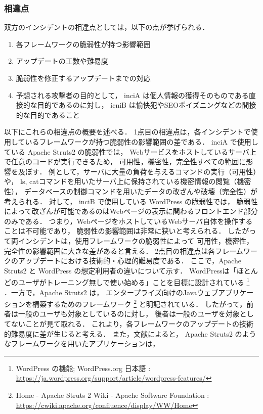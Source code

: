\documentclass[uplatex]{jsarticle}
\begin{document}
\subsubsection*{相違点}
双方のインシデントの相違点としては，以下の点が挙げられる．
\begin{enumerate}
    \item 各フレームワークの脆弱性が持つ影響範囲
    \item アップデートの工数や難易度
    \item 脆弱性を修正するアップデートまでの対応
    \item 予想される攻撃者の目的として，
    inciA は個人情報の獲得そのものである直接的な目的であるのに対し，
    icniB は愉快犯やSEOポイズニングなどの間接的な目的であること
\end{enumerate}
以下にこれらの相違点の概要を述べる．
1点目の相違点は，各インシデントで使用しているフレームワークが持つ脆弱性の影響範囲の差である．
inciA で使用している Apache Struts2 の脆弱性では，
Webサービスをホストしているサーバ上で任意のコードが実行できるため，
可用性，機密性，完全性すべての範囲に影響を及ぼす．
例として，サーバに大量の負荷を与えるコマンドの実行（可用性）や，
ls, catコマンドを用いたサーバ上に保持されている機密情報の閲覧（機密性），
データベースの制御コマンドを用いたデータの改ざんや破壊（完全性）が考えられる．
対して， inciB で使用している WordPress の脆弱性では，
脆弱性によって改ざんが可能であるのはWebページの表示に関わるフロントエンド部分のみである．
つまり，WebページをホストしているWebサーバ自体を操作することは不可能であり，
脆弱性の影響範囲は非常に狭いと考えられる．
したがって両インシデントは，使用フレームワークの脆弱性によって
可用性，機密性，完全性の影響範囲に大きな差があると言える．
2点目の相違点は各フレームワークのアップデートにおける技術的・心理的難易度である．
ここで，Apache Struts2 と WordPress の想定利用者の違いについて示す．
WordPressは「ほとんどのユーザがトレーニング無しで使い始める」ことを目標に設計されている
\footnote{
    WordPress の機能; WordPress.org 日本語
    : \url{https://ja.wordpress.org/support/article/wordpress-features/}
}
．一方で，Apache Struts2 は，
エンタープライズ向けのJavaウェブアプリケーションを構築するためのフレームワーク
\footnote{
    Home - Apache Struts 2 Wiki - Apache Software Foundation
    : \url{https://cwiki.apache.org/confluence/display/WW/Home}
}
と明記されている．
したがって，前者は一般のユーザも対象としているのに対し，
後者は一般のユーザを対象としてないことが見て取れる．
これより，各フレームワークのアップデートの技術的難易度に差が生じると考える．
また，文献\cite{do_developers}によると，
Apache Struts2 のようなフレームワークを用いたアプリケーションは，
\end{document}
